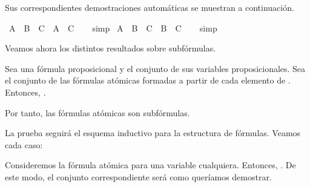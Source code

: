 \begin{isabellebody}
%
\endisatagproof
{\isafoldproof}%
%
\isadelimproof
%
\endisadelimproof
%
\begin{isamarkuptext}%
Sus correspondientes demostraciones automáticas se muestran a 
  continuación.%
\end{isamarkuptext}\isamarkuptrue%
\isamarkupfalse%
\ {\isachardoublequoteopen}A\ {\isasymunion}\ B\ {\isasymsubseteq}\ C\ {\isasymLongrightarrow}\ A\ {\isasymsubseteq}\ C{\isachardoublequoteclose}\isanewline
%
\isadelimproof
\ \ %
\endisadelimproof
%
\isatagproof
{}\isamarkupfalse%
\ simp%
\endisatagproof
{\isafoldproof}%
%
\isadelimproof
\isanewline
%
\endisadelimproof
\isanewline
{}\isamarkupfalse%
\ {\isachardoublequoteopen}A\ {\isasymunion}\ B\ {\isasymsubseteq}\ C\ {\isasymLongrightarrow}\ B\ {\isasymsubseteq}\ C{\isachardoublequoteclose}\isanewline
%
\isadelimproof
\ \ %
\endisadelimproof
%
\isatagproof
{}\isamarkupfalse%
\ simp%
\endisatagproof
{\isafoldproof}%
%
\isadelimproof
%
\endisadelimproof
%
\begin{isamarkuptext}%
Veamos ahora los distintos resultados sobre subfórmulas.

  \begin{lema}
    Sea  una fórmula proposicional y  el conjunto de 
    sus variables proposicionales. Sea  el conjunto de las fórmulas 
    atómicas formadas a partir de cada elemento de . 
    Entonces, .

    Por tanto, las fórmulas atómicas son subfórmulas.
  \end{lema}

  \begin{demostracion}
    La prueba seguirá el esquema inductivo para la estructura de 
    fórmulas. Veamos cada caso:
  
    Consideremos la fórmula atómica  para  una variable 
    cualquiera. Entonces, . De este modo, el 
    conjunto  correspondiente será 
     como queríamos 
    demostrar.


\end{demostracion}
\end{isamarkuptext}
\end{isabellebody}
